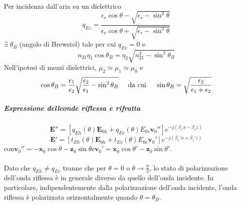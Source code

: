 \documentclass[a4paper]{article}
\begin{document}
\begin{itemize}
\begin{equation*}
\begin{array}{lr}
\end{array}
\end{equation*}
Per incidenza dall'aria su un dielettrico
\begin{equation*}
q_{Ev}=\frac{\epsilon_r\cos\theta-\sqrt{\epsilon_r-\sin^2\theta}}{\epsilon_r\cos\theta+\sqrt{\epsilon_r-\sin^2\theta}}
\end{equation*}
$\exists\,\,\theta_B$ (angolo di Brewstel) tale per cui $q_{Ev}=0$ e
\begin{equation*}
n_{21}\eta_1\cos\theta_B=\eta_2\sqrt{n_{21}^2-\sin^2\theta_B}
\end{equation*}
Nell'ipotesi di mezzi dielettrici, $\mu_2\simeq\mu_1\simeq\mu_0$ e
\begin{equation*}
\cos\theta_B=\frac{\epsilon_1}{\epsilon_2}\sqrt{\frac{\epsilon_2}{\epsilon_1}-\sin^2\theta_B}\hspace*{5mm}\text{da cui}\hspace{5mm}\sin\theta_B=\sqrt{\frac{\epsilon_2}{\epsilon_1+\epsilon_2}}
\end{equation*}
\end{itemize}
\subparagraph*{Espressione delleonde riflessa e rifratta\\}
\begin{equation*}
\textbf{E}''=[q_{Eh}(\theta)\textbf{E}_{0h}+q_{Ev}(\theta)E_{0v}\textbf{v}_0'']e^{-j(\beta_xx-\beta_zz)}
\end{equation*}
\begin{equation*}
\textbf{E}'=[t_{Eh}(\theta)\textbf{E}_{0h}+t_{Ev}(\theta)E_{0v}\textbf{v}_0']e^{-j(\beta_x'x+\beta_z'z)}
\end{equation*}
con\hspace{5mm}$\textbf{v}_0''=-\textbf{x}_0\cos\theta-\textbf{z}_0\sin\theta$\hspace{5mm}e\hspace{5mm}$\textbf{v}_0'=\textbf{x}_0\cos\theta'-\textbf{z}_0\sin\theta'$.\\\\
Dato che $q_{Eh}\neq q_{Ev}$ tranne che per $\theta=0$ o $\theta\rightarrow\frac{\pi}{2}$, lo stato di polarizzazione dell'onda riflessa è in generale diverso da quello dell'onda incidente. In particolare, indipendentemente dalla polarizzazione dell'onda incidente, l'onda riflessa è polarizzata orizzontalmente quando $\theta=\theta_B$.

\end{document}
